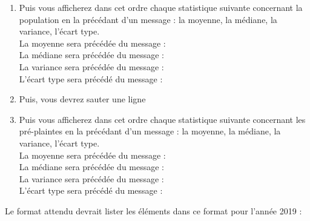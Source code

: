 \begin{enumerate}
\item Puis vous afficherez dans cet ordre chaque statistique suivante concernant la population en la précédant d'un message : la moyenne, la médiane, la variance, l'écart type.\\
La moyenne sera précédée du message : \og {} \fg{} \\
La médiane sera précédée du message : \og {} \fg{} \\
La variance sera précédée du message : \og {} \fg{} \\
L'écart type sera précédé du message : \og {} \fg{} \\

\item Puis, vous devrez sauter une ligne

\item Puis vous afficherez dans cet ordre chaque statistique suivante concernant les pré-plaintes en la précédant d'un message : la moyenne, la médiane, la variance, l'écart type.\\
La moyenne sera précédée du message : \og {} \fg{} \\
La médiane sera précédée du message : \og {} \fg{} \\
La variance sera précédée du message : \og {} \fg{} \\
L'écart type sera précédé du message : \og {} \fg{}
\end{enumerate}


\clearpage


\noindent Le format attendu devrait lister les éléments dans ce format pour l'année 2019 :

\bigskip

